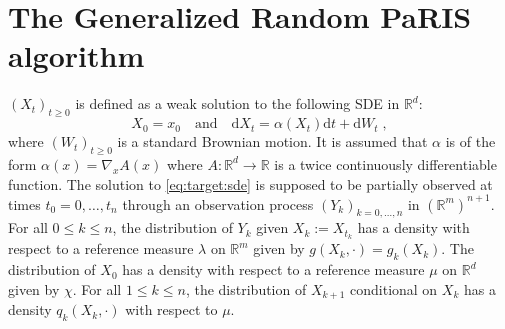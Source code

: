 \documentclass[12pt]{article}
\newcommand{\rmd}{\mathrm{d}}
\newcommand{\eqsp}{\;}
\newcommand{\1}{\mathrm{1}}
\newcommand{\qk}{q_{k}}
\begin{document}
\section{The Generalized Random PaRIS algorithm}
\label{sec:rwparis}
$(X_t)_{t\ge 0}$ is defined as a weak solution to the following SDE in $\mathbb{R}^d$:
\begin{equation}
\label{eq:target:sde}
X_0 = x_0\quad\mbox{and}\quad \rmd X_t = \alpha(X_t)\rmd t + \rmd W_t\eqsp,
\end{equation}
where $(W_t)_{t\ge 0}$ is a standard Brownian motion. It is assumed that $\alpha$ is of the form $\alpha(x) = \nabla_x A(x)$ where $A: \mathbb{R}^d \to \mathbb{R}$ is a twice continuously differentiable function. 
The solution to \eqref{eq:target:sde} is supposed to be partially observed at times $t_0=0,\dots,t_n$ through an observation process $(Y_k)_{k=0,\dots,n}$ in $(\mathbb{R}^m)^{n+1}$. 
For all $0\le k \le n$, the distribution of $Y_k$ given $X_k:= X_{t_k}$ has a density with respect to a reference measure $\lambda$ on $\mathbb{R}^m$ given by $g(X_k,\cdot) = g_k(X_k)$. 
The distribution of $X_0$ has a density with respect to a reference measure $\mu$ on $\mathbb{R}^d$ given by $\chi$.
For all $1\le k \le n$, the distribution of $X_{k+1} $ conditional on $X_{k}$ has a density $\qk(X_{k},\cdot)$ with respect to $\mu$.
 
\end{document}
